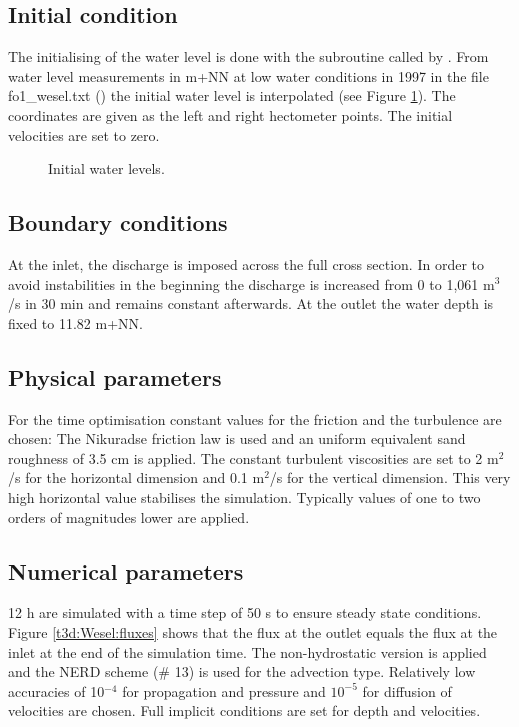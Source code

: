 \subsection{Initial condition}

The initialising of the water level is done with the subroutine
 called by .
From water level measurements in m+NN at low water conditions in 1997 in the
file fo1\_wesel.txt () the initial water level is
interpolated (see Figure \ref{t3d:Wesel:free_surface0}).
The coordinates are given as the left and right hectometer points.
The initial velocities are set to zero.

\begin{figure} [h!]
\centering
{}
\caption{Initial water levels.}
\label{t3d:Wesel:free_surface0}
\end{figure}

\subsection{Boundary conditions}

At the inlet, the discharge is imposed across the full cross section.
In order to avoid instabilities in the beginning the discharge is increased
from 0 to 1,061 m$^3$/s in 30 min and remains constant afterwards.
At the outlet the water depth is fixed to 11.82 m+NN.


\subsection{Physical parameters}
For the time optimisation constant values for the friction and the turbulence
are chosen:
The Nikuradse friction law is used and an uniform equivalent sand roughness of
3.5 cm is applied.
The constant turbulent viscosities are set to 2 m$^2$/s for the horizontal
dimension and 0.1 m$^2$/s for the vertical dimension.
This very high horizontal value stabilises the simulation.
Typically values of one to two orders of magnitudes lower are applied.

\subsection{Numerical parameters}
12 h are simulated with a time step of 50 s to ensure steady state conditions.
Figure \ref{t3d:Wesel:fluxes} shows that the flux at the outlet equals the flux
at the inlet at the end of the simulation time.
The non-hydrostatic version is applied and the NERD scheme (\# 13) is used for
the advection type.
Relatively low accuracies of 10$^{-4}$ for propagation and pressure
and $10^{-5}$ for diffusion of velocities are chosen.
Full implicit conditions are set for depth and velocities.

